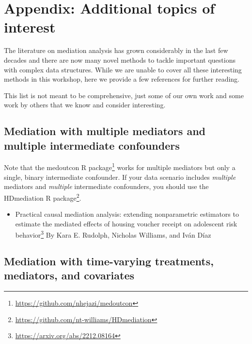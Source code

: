 \documentclass[
  12pt,
]{book}
\providecommand{\tightlist}{%
  \setlength{\itemsep}{0pt}\setlength{\parskip}{0pt}}
\renewcommand{\href}[2]{#2\footnote{\url{#1}}}
\theoremstyle{definition}
\theoremstyle{definition}
\theoremstyle{definition}
\newcommand{\1}{\mathbbm{1}}
\begin{document}
\hypertarget{appendix-additional-topics-of-interest}{%
\chapter{Appendix: Additional topics of interest}\label{appendix-additional-topics-of-interest}}

The literature on mediation analysis has grown considerably in the last few
decades and there are now many novel methods to tackle important questions with
complex data structures. While we are unable to cover all these interesting
methods in this workshop, here we provide a few references for further reading.

This list is not meant to be comprehensive, just some of our own work and some
work by others that we know and consider interesting.

\hypertarget{mediation-with-multiple-mediators-and-multiple-intermediate-confounders}{%
\section{Mediation with multiple mediators and multiple intermediate confounders}\label{mediation-with-multiple-mediators-and-multiple-intermediate-confounders}}

Note that the \href{https://github.com/nhejazi/medoutcon}{medoutcon R package} works for multiple mediators but only a single, binary intermediate
confounder. If your data scenario includes \emph{multiple} mediators and \emph{multiple} intermediate confounders, you should use the \href{https://github.com/nt-williams/HDmediation}{HDmediation R package}.

\begin{itemize}
\tightlist
\item
  \href{https://arxiv.org/abs/2212.08164}{Practical causal mediation analysis: extending nonparametric estimators to estimate the mediated effects of housing voucher receipt on adolescent risk behavior}
  By Kara E. Rudolph,
  Nicholas Williams, and Iván Díaz
\end{itemize}

\hypertarget{mediation-with-time-varying-treatments-mediators-and-covariates}{%
\section{Mediation with time-varying treatments, mediators, and covariates}\label{mediation-with-time-varying-treatments-mediators-and-covariates}}
\end{document}
